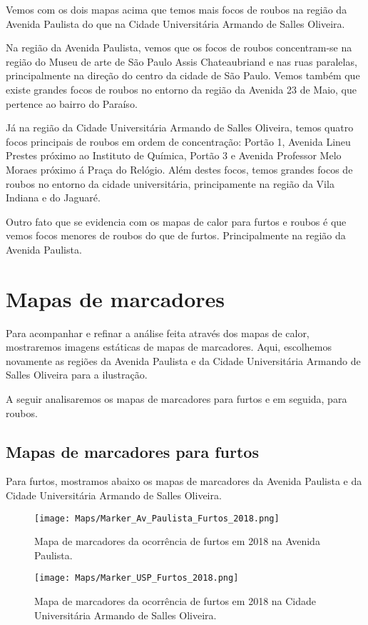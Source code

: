 \documentclass[
	12pt,
	openright,			%
	twoside,			%
	a4paper,			%
	chapter=TITLE,		%
	section=TITLE,		%
	subsection=TITLE,	%
	subsubsection=TITLE,%
	english,			%
	french,				%
	spanish,			%
	brazil				%
	]{abntex2}
\begin{document}
Vemos com os dois mapas acima que temos mais focos de roubos na região da Avenida Paulista do que na Cidade Universitária Armando de Salles Oliveira.

Na região da  Avenida Paulista, vemos que os focos de roubos  concentram-se na região do Museu de arte de São Paulo Assis Chateaubriand e nas ruas paralelas, principalmente na direção do centro da cidade de São Paulo. Vemos também que existe grandes focos de roubos no entorno da região da Avenida 23 de Maio, que pertence ao bairro do Paraíso.

Já na região da Cidade Universitária Armando de Salles Oliveira, temos quatro focos principais de roubos em ordem de concentração: Portão 1, Avenida Lineu Prestes próximo ao Instituto de Química, Portão 3 e Avenida Professor Melo Moraes próximo á Praça do Relógio. Além destes focos, temos grandes focos de roubos no entorno da cidade universitária, principamente na região da Vila Indiana e do Jaguaré.

Outro fato que se evidencia com os mapas de calor para furtos e roubos é que vemos focos menores de roubos do que de furtos. Principalmente na região da Avenida Paulista.

\section{Mapas de marcadores}
Para acompanhar e refinar a análise feita através dos mapas de calor, mostraremos imagens estáticas de mapas de marcadores. Aqui, escolhemos novamente as regiões da Avenida Paulista e da Cidade Universitária Armando de Salles Oliveira para a ilustração.

A seguir analisaremos os mapas de marcadores para furtos e em seguida, para roubos.

\subsection{Mapas de marcadores para furtos}
Para furtos, mostramos abaixo os mapas de marcadores da Avenida Paulista e da Cidade Universitária Armando de Salles Oliveira.

\begin{figure}[!htbp]
\centering
\texttt{[image: Maps/Marker\_Av\_Paulista\_Furtos\_2018.png]}
\caption{Mapa de marcadores da ocorrência de furtos em 2018 na Avenida Paulista.}
\end{figure}
\newpage
\begin{figure}
\centering
\texttt{[image: Maps/Marker\_USP\_Furtos\_2018.png]}
\caption{Mapa de marcadores da ocorrência de furtos em 2018 na Cidade Universitária Armando de Salles Oliveira.}
\end{figure}
\end{document}
